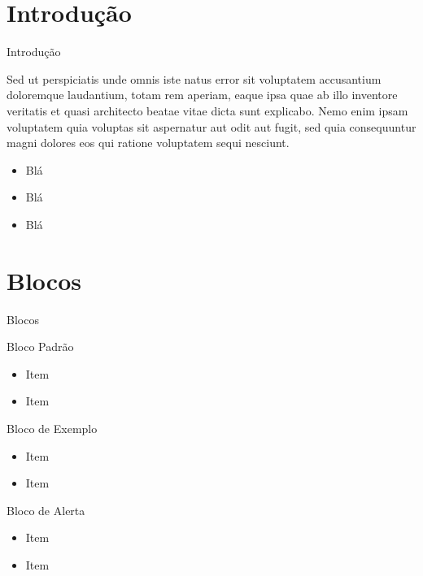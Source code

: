 \documentclass{beamer}
\begin{document}
\section{Introdução}
\begin{frame}{Introdução}
	
	Sed ut perspiciatis unde omnis iste natus error sit voluptatem accusantium doloremque laudantium, totam rem aperiam, eaque ipsa quae ab illo inventore veritatis et quasi architecto beatae vitae dicta sunt explicabo. Nemo enim ipsam voluptatem quia voluptas sit aspernatur aut odit aut fugit, sed quia consequuntur magni dolores eos qui ratione voluptatem sequi nesciunt. 
	
	\begin{itemize}
		\item Blá
		\item Blá
		\item Blá
	\end{itemize}

\end{frame}


\section{Blocos}

\begin{frame}{Blocos}

	\begin{block}{Bloco Padrão}
		\begin{itemize}
			\item Item
			\item Item
		\end{itemize}
	\end{block}
	
	
	\begin{exampleblock}{Bloco de Exemplo}
		\begin{itemize}
			\item Item
			\item Item
		\end{itemize}
	\end{exampleblock}
	
	\begin{alertblock}{Bloco de Alerta}
		\begin{itemize}
			\item Item
			\item Item
		\end{itemize}
	\end{alertblock}

\end{frame}
\end{document}
